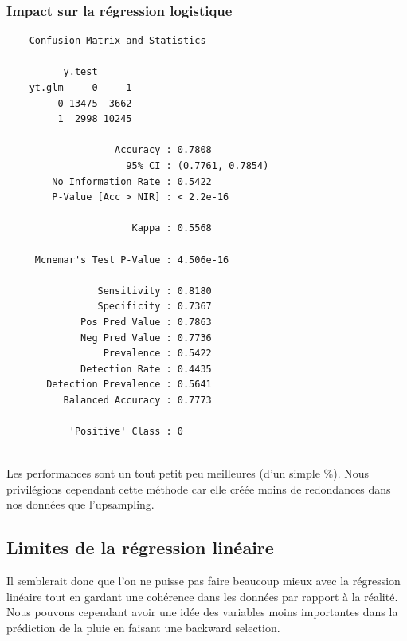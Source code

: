 \documentclass{article}
\begin{document}
\subsubsection{Impact sur la régression logistique}
\begin{multicols}{2}
    \begin{verbatim}
    Confusion Matrix and Statistics
  
          y.test
    yt.glm     0     1
         0 13475  3662
         1  2998 10245
                                              
                   Accuracy : 0.7808          
                     95% CI : (0.7761, 0.7854)
        No Information Rate : 0.5422          
        P-Value [Acc > NIR] : < 2.2e-16       
                                              
                      Kappa : 0.5568          
                                              
     Mcnemar's Test P-Value : 4.506e-16       
                                              
                Sensitivity : 0.8180          
                Specificity : 0.7367          
             Pos Pred Value : 0.7863          
             Neg Pred Value : 0.7736          
                 Prevalence : 0.5422          
             Detection Rate : 0.4435          
       Detection Prevalence : 0.5641          
          Balanced Accuracy : 0.7773          

           'Positive' Class : 0 
                                 
    \end{verbatim}
\end{multicols}

Les performances sont un tout petit peu meilleures (d'un simple \%). Nous privilégions cependant cette méthode car elle créée moins de redondances dans nos données que l'upsampling. 

\subsection{Limites de la régression linéaire}

Il semblerait donc que l'on ne puisse pas faire beaucoup mieux avec la régression linéaire tout en gardant une cohérence dans les données par rapport à la réalité. Nous pouvons cependant avoir une idée des variables moins importantes dans la prédiction de la pluie en faisant une backward selection. 
\end{document}
